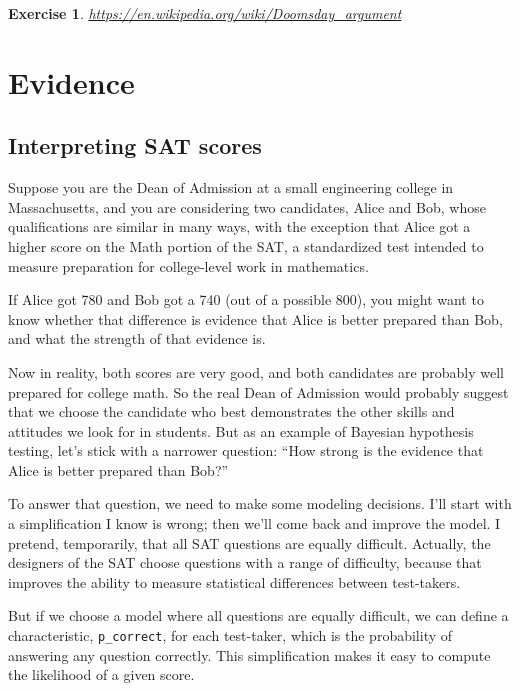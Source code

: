 \documentclass[12pt]{book}
\theoremstyle{exercise}
\newtheorem{exercise}{Exercise}[chapter]
\begin{document}
\begin{exercise}

\url{https://en.wikipedia.org/wiki/Doomsday_argument}
\end{exercise}


\chapter{Evidence}
\label{evidence}

\section{Interpreting SAT scores}

Suppose you are the Dean of Admission at a small engineering
college in Massachusetts, and you are considering two candidates,
Alice and Bob, whose qualifications are similar in many ways,
with the exception that Alice got a higher score on the Math
portion of the SAT, a standardized test intended to measure
preparation for college-level work in mathematics.

If Alice got 780 and Bob got a 740 (out of a possible 800), you might
want to know whether that difference is evidence that Alice is better
prepared than Bob, and what the strength of that evidence is.

Now in reality, both scores are very good, and both 
candidates are probably well prepared for college math.  So
the real Dean of Admission would probably suggest that we choose
the candidate who best demonstrates the other skills and
attitudes we look for in students.  But as an example of
Bayesian hypothesis testing, let's stick with a narrower question:
``How strong is the evidence that Alice is better prepared
than Bob?''

To answer that question, we need to make some modeling decisions.
I'll start with a simplification I know is wrong; then we'll come back
and improve the model.  I pretend, temporarily, that
all SAT questions are equally difficult.  Actually, the designers of
the SAT choose questions with a range of difficulty, because that
improves the ability to measure statistical differences between
test-takers.

But if we choose a model where all questions are equally difficult, we
can define a characteristic, \verb"p_correct", for each test-taker,
which is the probability of answering any question correctly.  This
simplification makes it easy to compute the likelihood of a given
score.
\end{document}
